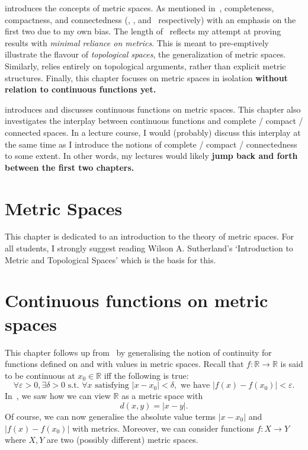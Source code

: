 \documentclass[12pt]{book}
\newcommand{\R}{\mathbb{R}}
\theoremstyle{remark}
\theoremstyle{definition}
\begin{document}
	 introduces the concepts of metric spaces. As mentioned in~, completeness, compactness, and connectedness  (, , and~ respectively) with an emphasis on the first two due to my own bias. The length of~ reflects my attempt at proving results with \textit{minimal reliance on metrics}. This is meant to pre-emptively illustrate the flavour of \textit{topological spaces}, the generalization of metric spaces. Similarly,  relies entirely on topological arguments, rather than explicit metric structures. Finally, this chapter focuses on metric spaces in isolation \textbf{without relation to continuous functions yet.}
	
	 introduces and discusses continuous functions on metric spaces. This chapter also investigates the interplay between continuous functions and complete / compact / connected spaces. In a lecture course, I would (probably) discuss this interplay at the same time as I introduce the notions of complete / compact / connectedness to some extent. In other words, my lectures would likely \textbf{jump back and forth between the first two chapters.}
	\chapter{Metric Spaces}
	\label{ch:metric_spaces}
	This chapter is dedicated to an introduction to the theory of metric spaces. For all students, I strongly suggest reading Wilson A. Sutherland's `Introduction to Metric and Topological Spaces' which is the basis for this.
	
	
	
	
	
	
%	
	\chapter{Continuous functions on metric spaces}
	\label{ch:cts_met}
	This chapter follows up from~ by generalising the notion of continuity for functions defined on and with values in metric spaces. Recall that $f:\R\to \R$ is said to be continuous at $x_0\in\R$ iff the following is true:
	\[
	\forall \varepsilon>0,\exists \delta>0\text{ s.t. }\forall x\text{ satisfying }|x-x_0|<\delta,\text{ we have }|f(x)-f(x_0)|<\varepsilon.
	\]
	In~, we saw how we can view $\R$ as a metric space with
	\[
	d(x,y) = |x-y|.
	\]
	Of course, we can now generalise the absolute value terms $|x-x_0|$ and $|f(x) - f(x_0)|$ with metrics. Moreover, we can consider functions $f:X \to Y$ where $X,Y$ are two (possibly different) metric spaces.
	
	
	
	
	
	
\end{document}
